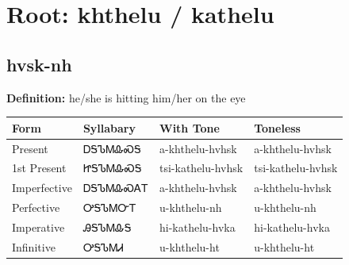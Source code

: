 \documentclass{article}%
\begin{document}
%
\normalsize%
\section*{Root: khthelu / kathelu}%
\subsection*{hvsk-nh}%
\textbf{Definition: }%
he/she is hitting him/her on the eye%
\\[0.5em]%
\begin{tabular}{|l|l|l|l|}%
\hline%
\textbf{Form}&\textbf{Syllabary}&\textbf{With Tone}&\textbf{Toneless}\\%
\hline%
Present&ᎠᎦᏖᎷᎲᏍᎦ&a{-}khthelu{-}hvhsk&a{-}khthelu{-}hvhsk\\%
1st Present&ᏥᎦᏖᎷᎲᏍᎦ&tsi{-}kathelu{-}hvhsk&tsi{-}kathelu{-}hvhsk\\%
Imperfective&ᎠᎦᏖᎷᎲᏍᎪᎢ&a{-}khthelu{-}hvhsk&a{-}khthelu{-}hvhsk\\%
Perfective&ᎤᎦᏖᎷᏅᎢ&u{-}khthelu{-}nh&u{-}khthelu{-}nh\\%
Imperative&ᎯᎦᏖᎷᎲᎦ&hi{-}kathelu{-}hvka&hi{-}kathelu{-}hvka\\%
Infinitive&ᎤᎦᏖᎷᏗ&u{-}khthelu{-}ht&u{-}khthelu{-}ht\\%
\hline%
\end{tabular}%
\\[1em]%
\end{document}
